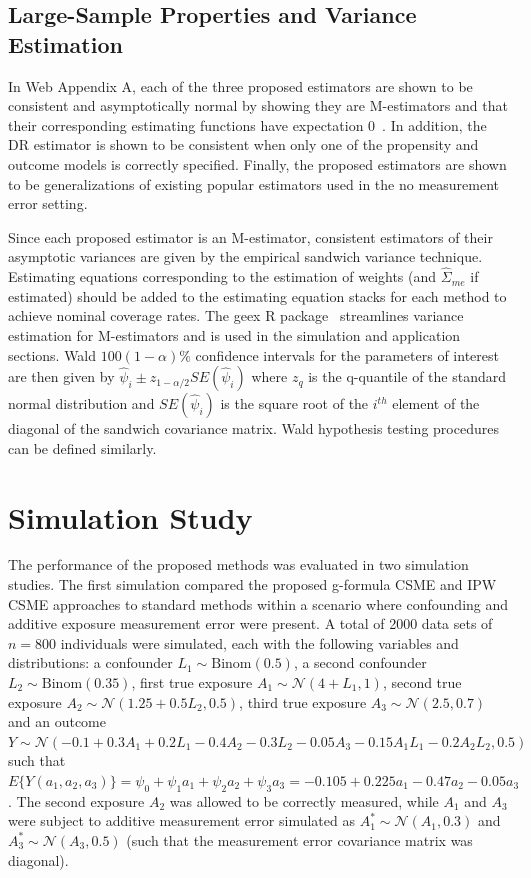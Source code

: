 \documentclass[useAMS,usenatbib,referee]{biom}
\begin{document}
\subsection{Large-Sample Properties and Variance Estimation}

In Web Appendix A, each of the three proposed estimators are shown to be consistent and asymptotically normal by showing they are M-estimators and that their corresponding estimating functions have expectation 0~\citep{stefanski2002}. In addition, the DR estimator is shown to be consistent when only one of the propensity and outcome models is correctly specified. Finally, the proposed estimators are shown to be generalizations of existing popular estimators used in the no measurement error setting.

Since each proposed estimator is an M-estimator, consistent estimators of their asymptotic variances are given by the empirical sandwich variance technique. Estimating equations corresponding to the estimation of weights (and $\hat{\Sigma}_{me}$ if estimated) should be added to the estimating equation stacks for each method to achieve nominal coverage rates. The geex R package~\citep{saul2017} streamlines variance estimation for M-estimators and is used in the simulation and application sections. Wald $100(1-\alpha)\%$ confidence intervals for the parameters of interest are then given by $\hat{\psi}_{i} \pm z_{1-\alpha/2} SE(\hat{\psi}_{i})$ where $z_q$ is the q-quantile of the standard normal distribution and $SE(\hat{\psi}_{i})$ is the square root of the $i^{th}$ element of the diagonal of the sandwich covariance matrix. Wald hypothesis testing procedures can be defined similarly.

\section{Simulation Study}

The performance of the proposed methods was evaluated in two simulation studies. The first simulation compared the proposed g-formula CSME and IPW CSME approaches to standard methods within a scenario where confounding and additive exposure measurement error were present. A total of 2000 data sets of $n = 800$ individuals were simulated, each with the following variables and distributions: a confounder $L_{1} \sim \text{Binom}(0.5)$, a second confounder $L_{2} \sim \text{Binom}(0.35)$, first true exposure $A_{1} \sim \mathcal{N}(4 + L_{1}, 1)$, second true exposure $A_{2} \sim \mathcal{N}(1.25 + 0.5L_{2}, 0.5)$, third true exposure $A_{3} \sim \mathcal{N}(2.5, 0.7)$ and an outcome $Y \sim \mathcal{N}(-0.1 + 0.3A_{1} + 0.2L_{1} - 0.4A_{2} - 0.3L_{2} - 0.05A_{3} - 0.15A_{1}L_{1} - 0.2A_{2}L_{2}, 0.5)$ such that $E \{ Y(a_{1}, a_{2}, a_{3}) \} = \psi_{0} + \psi_{1}a_{1} + \psi_{2}a_{2} + \psi_{3}a_{3} = -0.105 + 0.225a_{1} - 0.47a_{2} - 0.05a_{3}$. The second exposure $A_{2}$ was allowed to be correctly measured, while $A_{1}$ and $A_{3}$ were subject to additive measurement error simulated as $A_{1}^{*} \sim \mathcal{N}(A_{1}, 0.3)$ and $A_{3}^{*} \sim \mathcal{N}(A_{3}, 0.5)$ (such that the measurement error covariance matrix was diagonal).
\end{document}
